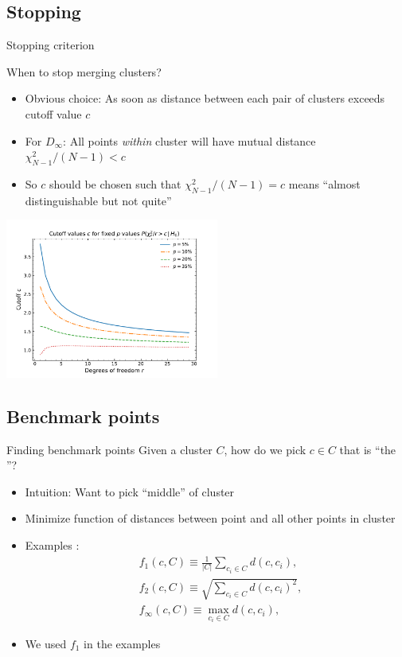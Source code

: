 \subsection{Stopping}
\begin{frame}{Stopping criterion}
	\begin{block}{When to stop merging clusters?}
		\begin{itemize}
			\item Obvious choice: As soon as distance between each pair of clusters exceeds cutoff value $c$ 
			\item For $D_\infty$: All points \emph{within} cluster will have mutual distance $\chi^2_{N-1}/(N-1) < c$
			\item So $c$ should be chosen such that $\chi^2_{N-1}/(N-1)=c$ means \enquote{almost distinguishable but not quite}
		\end{itemize}
	{\centering
	\includegraphics[width=7cm,clip,trim=0cm 0cm 0cm 0.75cm]{figures/erratum-plots/cutoff_values.pdf}\par}
	\end{block}
\end{frame}
%
\subsection{Benchmark points}
\begin{frame}{Finding benchmark points}
	Given a cluster $C$, how do we pick $c\in C$ that is \enquote{the }?
	\begin{itemize}[<+->]
		\item Intuition: Want to pick \enquote{middle} of cluster
		\item Minimize function of distances between point and all other points in cluster
		\item Examples :
		\begin{align*}%
		&f_1(c, C) \equiv \frac 1{|C|}\sum_{c_i\in C} d(c, c_i),\\
		&f_2(c, C) \equiv \sqrt{\sum_{c_i\in C} d(c, c_i)^2},\\
		&f_\infty(c, C) \equiv \max_{c_i\in C} d(c, c_i),
		\end{align*}
		\item We used $f_1$ in the examples
	\end{itemize}
	
	
\end{frame}
%